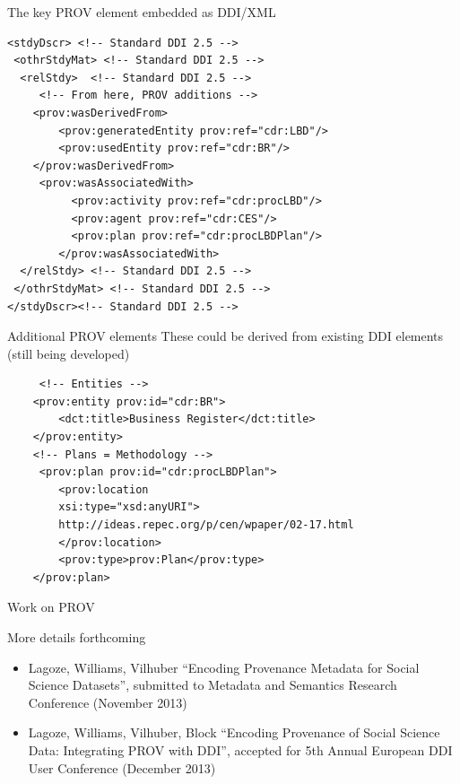 \begin{frame}[fragile]{}
\begin{block}{The key PROV element embedded as DDI/XML}
\begin{verbatim}
<stdyDscr> <!-- Standard DDI 2.5 -->
 <othrStdyMat> <!-- Standard DDI 2.5 -->
  <relStdy>  <!-- Standard DDI 2.5 -->
     <!-- From here, PROV additions -->
    <prov:wasDerivedFrom>
        <prov:generatedEntity prov:ref="cdr:LBD"/>
        <prov:usedEntity prov:ref="cdr:BR"/>
    </prov:wasDerivedFrom>
     <prov:wasAssociatedWith>
          <prov:activity prov:ref="cdr:procLBD"/>
          <prov:agent prov:ref="cdr:CES"/>
          <prov:plan prov:ref="cdr:procLBDPlan"/>
        </prov:wasAssociatedWith>     
  </relStdy> <!-- Standard DDI 2.5 -->
 </othrStdyMat> <!-- Standard DDI 2.5 -->
</stdyDscr><!-- Standard DDI 2.5 -->
\end{verbatim}
\end{block}
\end{frame}

\begin{frame}[fragile]
\begin{block}{Additional PROV elements}
These could be derived from existing DDI elements (still being developed)
\begin{verbatim}
     <!-- Entities -->
    <prov:entity prov:id="cdr:BR">
        <dct:title>Business Register</dct:title>
    </prov:entity>
    <!-- Plans = Methodology -->
     <prov:plan prov:id="cdr:procLBDPlan">       
        <prov:location 
        xsi:type="xsd:anyURI">
        http://ideas.repec.org/p/cen/wpaper/02-17.html
        </prov:location>
        <prov:type>prov:Plan</prov:type>
    </prov:plan>
\end{verbatim}
\end{block}
\end{frame}




\begin{frame}{Work on PROV}
\begin{block}{More details forthcoming}
\begin{itemize}
\item Lagoze, Williams, Vilhuber ``Encoding Provenance Metadata for
Social Science Datasets'', submitted to Metadata and Semantics Research Conference 
(November 2013)
\item Lagoze, Williams, Vilhuber, Block ``Encoding Provenance of Social Science Data: 
Integrating PROV with DDI'', accepted for 5th Annual European DDI User Conference 
(December 2013)
\end{itemize}
\end{block}
\end{frame}


